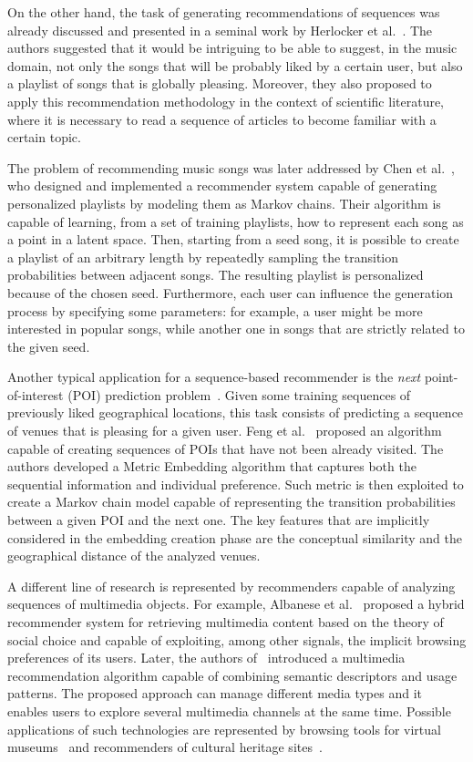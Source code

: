 On the other hand, the task of generating recommendations of sequences was already discussed and presented in a seminal work by Herlocker et al.~\cite{Herlocker2004}. The authors suggested that it would be intriguing to be able to suggest, in the music domain, not only the songs that will be probably liked by a certain user, but also a playlist of songs that is globally pleasing. Moreover, they also proposed to apply this recommendation methodology in the context of scientific literature, where it is necessary to read a sequence of articles to become familiar with a certain topic.

The problem of recommending music songs was later addressed by Chen et al.~\cite{Chen2012}, who designed and implemented a recommender system capable of generating personalized playlists by modeling them as Markov chains. Their algorithm is capable of learning, from a set of training playlists, how to represent each song as a point in a latent space. Then, starting from a seed song, it is possible to create a playlist of an arbitrary length by repeatedly sampling the transition probabilities between adjacent songs. The resulting playlist is personalized because of the chosen seed. Furthermore, each user can influence the generation process by specifying some parameters: for example, a user might be more interested in popular songs, while another one in songs that are strictly related to the given seed.

Another typical application for a sequence-based recommender is the \emph{next} point-of-interest (POI) prediction problem~\cite{Quadrana2018}. Given some training sequences of previously liked geographical locations, this task consists of predicting a sequence of venues that is pleasing for a given user. Feng et al.~\cite{Feng2015} proposed an algorithm capable of creating sequences of POIs that have not been already visited. The authors developed a Metric Embedding algorithm that captures both the sequential information and individual preference. Such metric is then exploited to create a Markov chain model capable of representing the transition probabilities between a given POI and the next one. The key features that are implicitly considered in the embedding creation phase are the conceptual similarity and the geographical distance of the analyzed venues.

A different line of research is represented by recommenders capable of analyzing sequences of multimedia objects. For example, Albanese et al.~\cite{Albanese2010} proposed a hybrid recommender system for retrieving multimedia content based on the theory of social choice and capable of exploiting, among other signals, the implicit browsing preferences of its users. Later, the authors of~\cite{Albanese2013} introduced a multimedia recommendation algorithm capable of combining semantic descriptors and usage patterns. The proposed approach can manage different media types and it enables users to explore several multimedia channels at the same time. Possible applications of such technologies are represented by browsing tools for virtual museums~\cite{Amato2017} and recommenders of cultural heritage sites~\cite{Su2019}.

